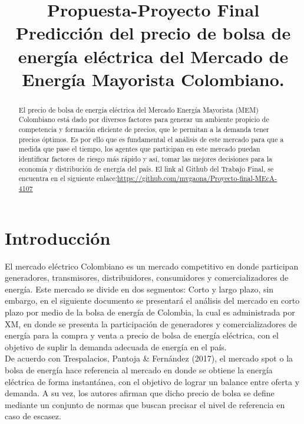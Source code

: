 \documentclass[conference, 10pt]{IEEEtran}
\begin{document}
\title{Propuesta-Proyecto Final\\Predicción del precio de bolsa de energía eléctrica del Mercado de Energía Mayorista Colombiano.}

\author{
\and
{}
}

\maketitle

\begin{abstract}
El precio de bolsa de energía eléctrica del Mercado Energía Mayorista (MEM) Colombiano está dado por diversos factores para generar un ambiente propicio de competencia y formación eficiente de precios, que le permitan a la demanda tener precios óptimos. Es por ello que es fundamental el análisis de este mercado para que a medida que pase el tiempo, los agentes que participan en este mercado puedan identificar factores de riesgo más rápido y así, tomar las mejores decisiones para la economía y  distribución de energía del país. El link al Github del Trabajo Final, se encuentra en el siguiente enlace:\url{https://github.com/mvgaona/Proyecto-final-MEcA-4107}\\


\end{abstract}


\section{Introducción} \label{sec:intro}
El mercado eléctrico Colombiano es un mercado competitivo en donde participan generadores, transmisores, distribuidores, consumidores y comercializadores de energía. Este mercado se divide en dos segmentos: Corto y  largo plazo, sin embargo, en el siguiente documento se presentará el análisis del mercado en corto plazo por medio de la bolsa de energía de Colombia, la cual es  administrada por XM,  en donde se presenta la participación de generadores y comercializadores de energía para la compra y venta a precio de bolsa de energía eléctrica, con el objetivo de suplir la demanda adecuada de energía en el país.   \\

De acuerdo con Trespalacios, Pantoja \& Fernández (2017)\cite{b5}, el mercado spot o la bolsa de energía hace referencia al mercado en donde se obtiene la energía eléctrica de forma instantánea, con el objetivo de lograr  un balance entre oferta y demanda. A su vez, los autores afirman que dicho precio de bolsa se define mediante un conjunto de normas que buscan precisar el nivel de referencia en caso de escasez. \\
\end{document}
